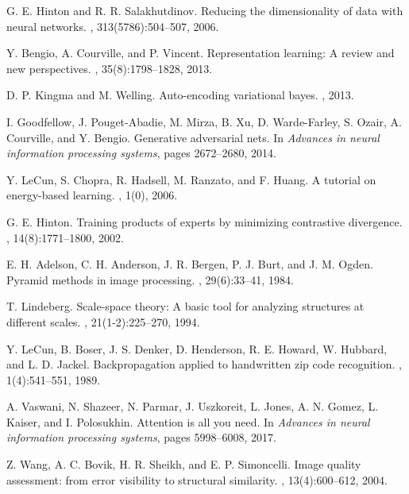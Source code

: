 \documentclass[12pt,a4paper]{article}
\begin{document}
\begin{enumerate}
\begin{thebibliography}{20}
G. E. Hinton and R. R. Salakhutdinov.
\newblock Reducing the dimensionality of data with neural networks.
, 313(5786):504--507, 2006.

Y. Bengio, A. Courville, and P. Vincent.
\newblock Representation learning: A review and new perspectives.
, 35(8):1798--1828, 2013.

D. P. Kingma and M. Welling.
\newblock Auto-encoding variational bayes.
, 2013.

I. Goodfellow, J. Pouget-Abadie, M. Mirza, B. Xu, D. Warde-Farley, S. Ozair, A. Courville, and Y. Bengio.
\newblock Generative adversarial nets.
\newblock In {\em Advances in neural information processing systems}, pages 2672--2680, 2014.

Y. LeCun, S. Chopra, R. Hadsell, M. Ranzato, and F. Huang.
\newblock A tutorial on energy-based learning.
, 1(0), 2006.

G. E. Hinton.
\newblock Training products of experts by minimizing contrastive divergence.
, 14(8):1771--1800, 2002.

E. H. Adelson, C. H. Anderson, J. R. Bergen, P. J. Burt, and J. M. Ogden.
\newblock Pyramid methods in image processing.
, 29(6):33--41, 1984.

T. Lindeberg.
\newblock Scale-space theory: A basic tool for analyzing structures at different scales.
, 21(1-2):225--270, 1994.

Y. LeCun, B. Boser, J. S. Denker, D. Henderson, R. E. Howard, W. Hubbard, and L. D. Jackel.
\newblock Backpropagation applied to handwritten zip code recognition.
, 1(4):541--551, 1989.

A. Vaswani, N. Shazeer, N. Parmar, J. Uszkoreit, L. Jones, A. N. Gomez, L. Kaiser, and I. Polosukhin.
\newblock Attention is all you need.
\newblock In {\em Advances in neural information processing systems}, pages 5998--6008, 2017.

Z. Wang, A. C. Bovik, H. R. Sheikh, and E. P. Simoncelli.
\newblock Image quality assessment: from error visibility to structural similarity.
, 13(4):600--612, 2004.


\end{thebibliography}
\end{enumerate}
\end{document}
